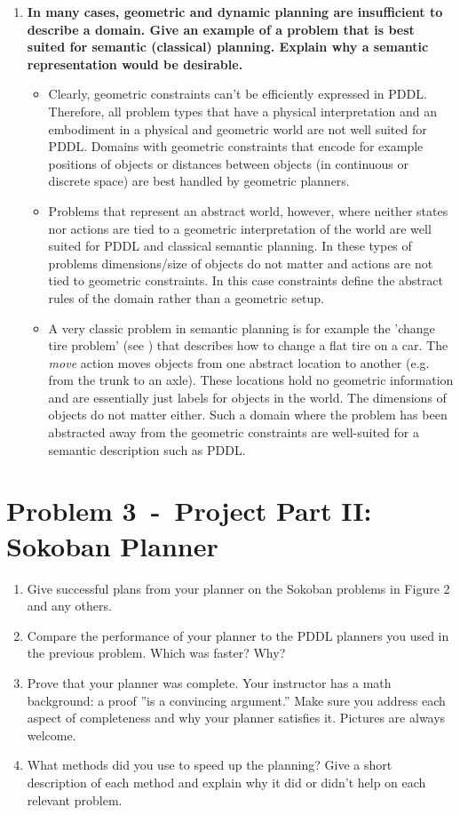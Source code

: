 \documentclass[12pt]{article}
\newcommand{\problem}[2]{\section*{Problem {#1}~-~{#2}}}
\begin{document}
\begin{enumerate}
 \item \textbf{In many cases, geometric and dynamic planning are insufficient to describe a domain. Give
an example of a problem that is best suited for semantic (classical) planning. Explain why a
semantic representation would be desirable.}
  \begin{itemize}
   \item Clearly, geometric constraints can't be efficiently expressed in PDDL. Therefore, all problem types that have a physical interpretation and an embodiment in a physical and geometric world are not well suited for PDDL. Domains with geometric constraints that encode for example positions of objects or distances between objects (in continuous or discrete space) are best handled by geometric planners. 
   \item Problems that represent an abstract world, however, where neither states nor actions are tied to a geometric interpretation of the world are well suited for PDDL and classical semantic planning. In these types of problems dimensions/size of objects do not matter and actions are not tied to geometric constraints. In this case constraints define the abstract rules of the domain rather than a geometric setup. 
   \item A very classic problem in semantic planning is for example the 'change tire problem' (see \cite{Russell2010}) that describes how to change a flat tire on a car. The \textit{move} action moves objects from one abstract location to another (e.g. from the trunk to an axle). These locations hold no geometric information and are essentially just labels for objects in the world. The dimensions of objects do not matter either. Such a domain where the problem has been abstracted away from the geometric constraints are well-suited for a semantic description such as PDDL.
  \end{itemize}

\end{enumerate}

\problem{3}{Project Part II: Sokoban Planner}
\label{sec:problem_3}
\begin{enumerate}
  \item Give successful plans from your planner on the Sokoban problems in Figure 2 and any others.
  \item Compare the performance of your planner to the PDDL planners you used in the previous
problem. Which was faster? Why?
  \item Prove that your planner was complete. Your instructor has a math background: a proof ”is
a convincing argument.” Make sure you address each aspect of completeness and why your
planner satisfies it. Pictures are always welcome.
  \item What methods did you use to speed up the planning? Give a short description of each method and explain why it did or didn't help on each relevant problem.
\end{enumerate}
\end{document}
